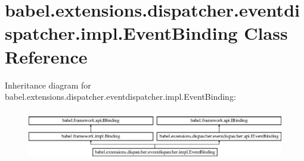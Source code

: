 \hypertarget{classbabel_1_1extensions_1_1dispatcher_1_1eventdispatcher_1_1impl_1_1_event_binding}{\section{babel.\-extensions.\-dispatcher.\-eventdispatcher.\-impl.\-Event\-Binding Class Reference}
\label{classbabel_1_1extensions_1_1dispatcher_1_1eventdispatcher_1_1impl_1_1_event_binding}
}
Inheritance diagram for babel.\-extensions.\-dispatcher.\-eventdispatcher.\-impl.\-Event\-Binding\-:\begin{figure}[H]
\begin{center}
\leavevmode
\includegraphics[height=2.240000cm]{classbabel_1_1extensions_1_1dispatcher_1_1eventdispatcher_1_1impl_1_1_event_binding}
\end{center}
\end{figure}
